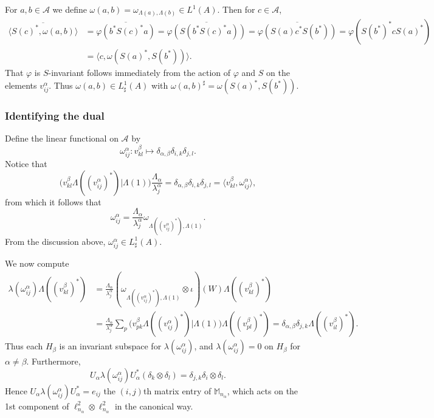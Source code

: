 \documentclass[twoside,a4paper,12pt]{article}
\theoremstyle{plain}
\theoremstyle{definition}
\newcommand{\ip}[2]{\langle #1,#2 \rangle}
\newcommand{\mc}{\mathcal}
\begin{document}
For $a,b\in\mc A$ we define $\omega(a,b) = \omega_{\Lambda(a),\Lambda(b)}
\in L^1(A)$.  Then for $c\in\mc A$,
\begin{align*} \overline{ \ip{S(c)^*}{\omega(a,b)} }
&= \overline{ \varphi(b^*S(c)^*a) }
= \overline{ \varphi(S(b^*S(c)^*a)) }
= \overline{ \varphi(S(a) c^* S(b^*)) }
= \varphi(S(b^*)^* c S(a)^*) \\
&= \ip{c}{\omega(S(a)^*,S(b^*))}. \end{align*}
That $\varphi$ is $S$-invariant follows immediately from the action of
$\varphi$ and $S$ on the elements $v^\alpha_{ij}$.
Thus $\omega(a,b)\in L^1_\sharp(A)$ with $\omega(a,b)^\sharp =
\omega(S(a)^*,S(b^*))$.


\subsubsection{Identifying the dual}

Define the linear functional on $\mc A$ by
\[ \omega^\alpha_{ij} : v^\beta_{kl} \mapsto \delta_{\alpha,\beta}
\delta_{i,k} \delta_{j,l}. \]
Notice that
\[ \big( v^\beta_{kl} \Lambda((v^\alpha_{ij})^*) \big| \Lambda(1) \big)
\frac{\Lambda_\alpha}{\lambda^\alpha_j}
= \delta_{\alpha,\beta} \delta_{i,k} \delta_{j,l}
= \ip{v^\beta_{kl}}{\omega^\alpha_{ij}}, \]
from which it follows that
\[ \omega^\alpha_{ij} = \frac{\Lambda_\alpha}{\lambda^\alpha_j}
\omega_{\Lambda((v^\alpha_{ij})^*), \Lambda(1)}. \]
From the discussion above, $\omega^\alpha_{ij}\in L^1_\sharp(A)$.

We now compute
\begin{align*}
\lambda(\omega^\alpha_{ij}) \Lambda((v^\beta_{kl})^*)
&= \frac{\Lambda_\alpha}{\lambda^\alpha_j}
(\omega_{\Lambda((v^\alpha_{ij})^*), \Lambda(1)}\otimes\iota)(W)
\Lambda((v^\beta_{kl})^*) \\
&= \frac{\Lambda_\alpha}{\lambda^\alpha_j}
\sum_p \big( v^\beta_{pk}\Lambda((v^\alpha_{ij})^*) \big| \Lambda(1) \big)
   \Lambda((v^\beta_{pl})^*)
= \delta_{\alpha,\beta} \delta_{j,k} \Lambda((v^\beta_{il})^*).
\end{align*}
Thus each $H_\beta$ is an invariant subspace for
$\lambda(\omega^\alpha_{ij})$, and $\lambda(\omega^\alpha_{ij})=0$ on
$H_\beta$ for $\alpha\not=\beta$.  Furthermore,
\[ U_\alpha \lambda(\omega^\alpha_{ij}) U_\alpha^*(\delta_k\otimes\delta_l)
= \delta_{j,k} \delta_i \otimes \delta_l. \]
Hence $U_\alpha \lambda(\omega^\alpha_{ij}) U_\alpha^* = e_{ij}$ the $(i,j)$th
matrix entry of $\mathbb M_{n_\alpha}$, which acts on the 1st component of
$\ell^2_{n_\alpha} \otimes \ell^2_{n_\alpha}$ in the canonical way.
\end{document}
